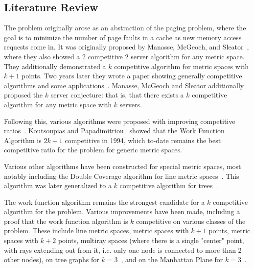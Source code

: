 \subsection{Literature Review}

The \KS problem originally arose as an abstraction of the paging problem, where the goal is to minimize the number of page faults in a cache as new memory access requests come in. It was originally proposed by Manasse, McGeoch, and Sleator~\cite{KS1988}, where they also showed a 2 competitive 2 server algorithm for any metric space. They additionally demonstrated a $k$ competitive algorithm for metric spaces with $k+1$ points. Two years later they wrote a paper showing generally competitive algorithms and some applications~\cite{KS1990}. Manasse, McGeoch and Sleator additionally proposed the $k$ server conjecture: that is, that there exists a $k$ competitive algorithm for any metric space with $k$ servers. 

Following this, various algorithms were proposed with improving competitive ratios~\cite{KS1990, harm2000}. Koutsoupias and Papadimitriou~\cite{KS1990} showed that the Work Function Algorithm is $2k-1$ competitive in 1994, which to-date remains the best competitive ratio for the \KS problem for generic metric spaces.

Various other algorithms have been constructed for special metric spaces, most notably including the Double Coverage algorithm for line metric spaces~\cite{new1991}. This algorithm was later generalized to a $k$ competitive algorithm for trees~\cite{tree1991}.

The work function algorithm remains the strongest candidate for a $k$ competitive algorithm for the \KS problem. Various improvements have been made, including a proof that the work function algorithm is $k$ competitive on various classes of the problem. These include line metric spaces, metric spaces with $k+1$ points, metric spaces with $k+2$ points, multiray spaces (where there is a single "center" point, with rays extending out from it, i.e. only one node is connected to more than 2 other nodes), on tree graphs for $k=3$~\cite{unifyingPotential2021}, and on the Manhattan Plane for $k=3$~\cite{MP2002}. 

